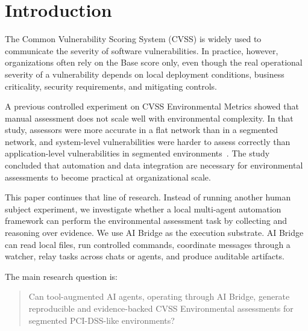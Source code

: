 \section{Introduction}

The Common Vulnerability Scoring System (CVSS) is widely used to communicate
the severity of software vulnerabilities. In practice, however, organizations
often rely on the Base score only, even though the real operational severity of
a vulnerability depends on local deployment conditions, business criticality,
security requirements, and mitigating controls.

A previous controlled experiment on CVSS Environmental Metrics showed that
manual assessment does not scale well with environmental complexity. In that
study, assessors were more accurate in a flat network than in a segmented
network, and system-level vulnerabilities were harder to assess correctly than
application-level vulnerabilities in segmented environments~\cite{allodi2017cvssenv}.
The study concluded that automation and data integration are necessary for
environmental assessments to become practical at organizational scale.

This paper continues that line of research. Instead of running another human
subject experiment, we investigate whether a local multi-agent automation
framework can perform the environmental assessment task by collecting and
reasoning over evidence. We use AI Bridge as the execution substrate. AI Bridge
can read local files, run controlled commands, coordinate messages through a
watcher, relay tasks across chats or agents, and produce auditable artifacts.

The main research question is:

\begin{quote}
Can tool-augmented AI agents, operating through AI Bridge, generate reproducible
and evidence-backed CVSS Environmental assessments for segmented PCI-DSS-like
environments?
\end{quote}
